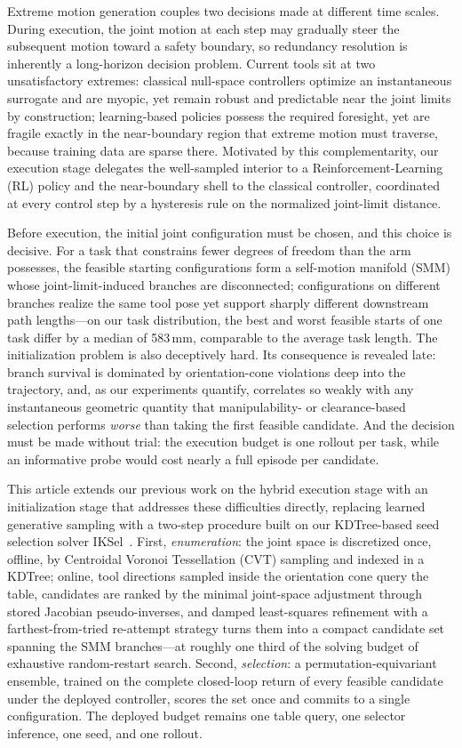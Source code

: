 \documentclass[journal]{IEEEtran}
\begin{document}
Extreme motion generation couples two decisions made at different time
scales. During execution, the joint motion at each step may gradually
steer the subsequent motion toward a safety boundary, so redundancy
resolution is inherently a long-horizon decision problem. Current tools
sit at two unsatisfactory extremes: classical null-space controllers
optimize an instantaneous surrogate and are myopic, yet remain robust
and predictable near the joint limits by construction; learning-based
policies possess the required foresight, yet are fragile exactly in the
near-boundary region that extreme motion must traverse, because training
data are sparse there. Motivated by this complementarity, our execution
stage delegates the well-sampled interior to a Reinforcement-Learning
(RL) policy and the near-boundary shell to the classical controller,
coordinated at every control step by a hysteresis rule on the normalized
joint-limit distance.

Before execution, the initial joint configuration must be chosen, and
this choice is decisive. For a task that constrains fewer degrees of
freedom than the arm possesses, the feasible starting configurations
form a self-motion manifold (SMM) whose joint-limit-induced branches are
disconnected; configurations on different branches realize the same
tool pose yet support sharply different downstream path lengths---on our
task distribution, the best and worst feasible starts of one task differ
by a median of 583\,mm, comparable to the average task length. The
initialization problem is also deceptively hard. Its consequence is
revealed late: branch survival is dominated by orientation-cone
violations deep into the trajectory, and, as our experiments quantify,
correlates so weakly with any instantaneous geometric quantity that
manipulability- or clearance-based selection performs \textit{worse}
than taking the first feasible candidate. And the decision must be made
without trial: the execution budget is one rollout per task, while an
informative probe would cost nearly a full episode per candidate.

This article extends our previous work on the hybrid execution stage
with an initialization stage that addresses these difficulties
directly, replacing learned generative sampling with a two-step
procedure built on our KDTree-based seed selection solver
IKSel~\cite{yuan2026iksel}. First, \textit{enumeration}: the joint space
is discretized once, offline, by Centroidal Voronoi Tessellation (CVT)
sampling and indexed in a KDTree; online, tool directions sampled inside
the orientation cone query the table, candidates are ranked by the
minimal joint-space adjustment through stored Jacobian pseudo-inverses,
and damped least-squares refinement with a farthest-from-tried
re-attempt strategy turns them into a compact candidate set spanning the
SMM branches---at roughly one third of the solving budget of exhaustive
random-restart search. Second, \textit{selection}: a
permutation-equivariant ensemble, trained on the complete closed-loop
return of every feasible candidate under the deployed controller, scores
the set once and commits to a single configuration. The deployed budget
remains one table query, one selector inference, one seed, and one
rollout.
\end{document}
